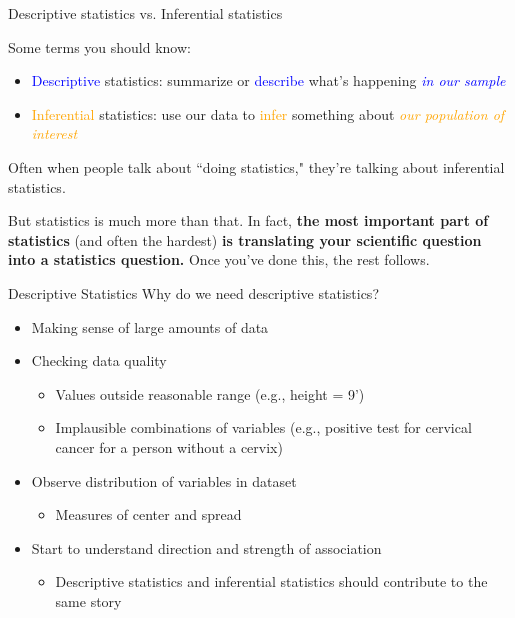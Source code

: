 \documentclass[10pt,t]{beamer}
\begin{document}
\begin{frame}{Descriptive statistics vs. Inferential statistics}

	Some terms you should know:
	
	\vspace{0.3cm}
	
	\begin{itemize}
		\item \textcolor{blue}{Descriptive} statistics: summarize or \textcolor{blue}{describe} what's happening \textcolor{blue}{\textit{in our sample}}
		\item \textcolor{orange}{Inferential} statistics: use our data to \textcolor{orange}{infer} something about \textcolor{orange}{\textit{our population of interest}}
	\end{itemize}
	
	\vspace{0.3cm}
	
	Often when people talk about ``doing statistics," they're talking about inferential statistics.
	
	\vspace{0.3cm}
	
	But statistics is much more than that. In fact, \textbf{the most important part of statistics} (and often the hardest) \textbf{is translating your scientific question into a statistics question.} Once you've done this, the rest follows.
	
\end{frame}

\begin{frame}{Descriptive Statistics}
Why do we need descriptive statistics?

\vspace{0.3cm}

\begin{itemize}
	\item Making sense of large amounts of data
	\item Checking data quality
	\begin{itemize}
		\item Values outside reasonable range (e.g., height = 9')
		\item Implausible combinations of variables (e.g., positive test for cervical cancer for a person without a cervix)
	\end{itemize}
	\item Observe distribution of variables in dataset
	\begin{itemize}
		\item Measures of center and spread
	\end{itemize}
	\item Start to understand direction and strength of association
	\begin{itemize}
		\item Descriptive statistics and inferential statistics should contribute to the same story
	\end{itemize}
\end{itemize}

\end{frame}
\end{document}
